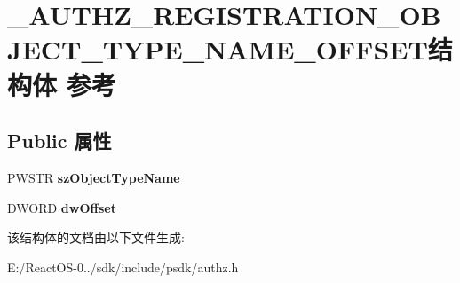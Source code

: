 \hypertarget{struct___a_u_t_h_z___r_e_g_i_s_t_r_a_t_i_o_n___o_b_j_e_c_t___t_y_p_e___n_a_m_e___o_f_f_s_e_t}{}\section{\+\_\+\+A\+U\+T\+H\+Z\+\_\+\+R\+E\+G\+I\+S\+T\+R\+A\+T\+I\+O\+N\+\_\+\+O\+B\+J\+E\+C\+T\+\_\+\+T\+Y\+P\+E\+\_\+\+N\+A\+M\+E\+\_\+\+O\+F\+F\+S\+E\+T结构体 参考}
\label{struct___a_u_t_h_z___r_e_g_i_s_t_r_a_t_i_o_n___o_b_j_e_c_t___t_y_p_e___n_a_m_e___o_f_f_s_e_t}
\subsection*{Public 属性}
\begin{DoxyCompactItemize}
\item 
\mbox{\label{struct___a_u_t_h_z___r_e_g_i_s_t_r_a_t_i_o_n___o_b_j_e_c_t___t_y_p_e___n_a_m_e___o_f_f_s_e_t_abbc3038e5240ceea803f4fd64cfbdf5c}} 
P\+W\+S\+TR {\bfseries sz\+Object\+Type\+Name}
\item 
\mbox{\label{struct___a_u_t_h_z___r_e_g_i_s_t_r_a_t_i_o_n___o_b_j_e_c_t___t_y_p_e___n_a_m_e___o_f_f_s_e_t_ae3026d11b21b422ec87a41ef11d065f9}} 
D\+W\+O\+RD {\bfseries dw\+Offset}
\end{DoxyCompactItemize}


该结构体的文档由以下文件生成\+:\begin{DoxyCompactItemize}
\item 
E\+:/\+React\+O\+S-\/0../sdk/include/psdk/authz.\+h\end{DoxyCompactItemize}
